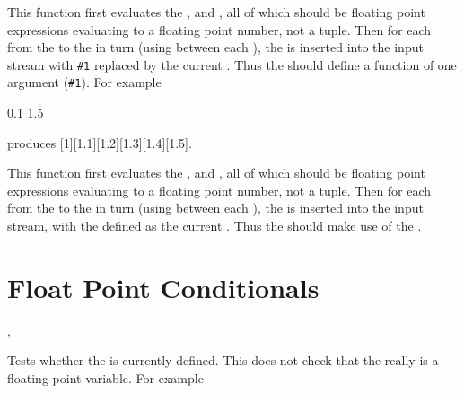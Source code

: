 \documentclass[oneside]{book}
\begin{document}
\begin{function}{\FpStepInline}
\begin{syntax}
    
\end{syntax}
This function first evaluates the , 
and , all of which should be floating point
expressions evaluating to a floating point number, not a tuple.
Then for each  from the  to the
 in turn (using  between each
), the  is inserted into the input stream
with \verb|#1| replaced by the current . Thus the
 should define a function of one argument (\verb|#1|).
For example
\begin{codehigh}
\IgnoreSpacesOn
\TlClear \lTmpaTl
{} {0.1} {1.5} {
  \TlPutRight \lTmpaTl {[#1]}
}
\Result {\Value\lTmpaTl}
\IgnoreSpacesOff
\end{codehigh}
produces [1][1.1][1.2][1.3][1.4][1.5].
\end{function}

\begin{function}{\FpStepVariable}
\begin{syntax}
     
\end{syntax}
This function first evaluates the , 
and , all of which should be floating point
expressions evaluating to a floating point number, not a tuple.
Then for each  from the  to the
 in turn (using  between each
), the  is inserted into the input stream,
with the  defined as the current .  Thus
the  should make use of the .
\end{function}

\section{Float Point Conditionals}

\begin{function}{\FpIfExist,\FpIfExistTF}
\begin{syntax}
 
   
\end{syntax}
Tests whether the  is currently defined.  This does not
check that the  really is a floating point variable.
For example
\begin{demohigh}
\FpIfExistTF {} {}
\FpIfExistTF {} {}
\end{demohigh}
\end{function}
\end{document}
